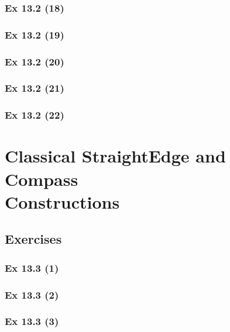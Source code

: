 \subsubsection{Ex 13.2 (18)}\label{sec:Ex_13.2.18}

\subsubsection{Ex 13.2 (19)}\label{sec:Ex_13.2.19}

\subsubsection{Ex 13.2 (20)}\label{sec:Ex_13.2.20}

\newpage		%

\subsubsection{Ex 13.2 (21)}\label{sec:Ex_13.2.21}

\subsubsection{Ex 13.2 (22)}\label{sec:Ex_13.2.22}

\newpage		%

\section{Classical StraightEdge and Compass\\ Constructions}\label{sec:13.3}	
\subsection*{Exercises}\label{sec:13.3_Exercises}

\subsubsection{Ex 13.3 (1)}\label{sec:Ex_13.3.1}

\subsubsection{Ex 13.3 (2)}\label{sec:Ex_13.3.2}

\subsubsection{Ex 13.3 (3)}\label{sec:Ex_13.3.3}

